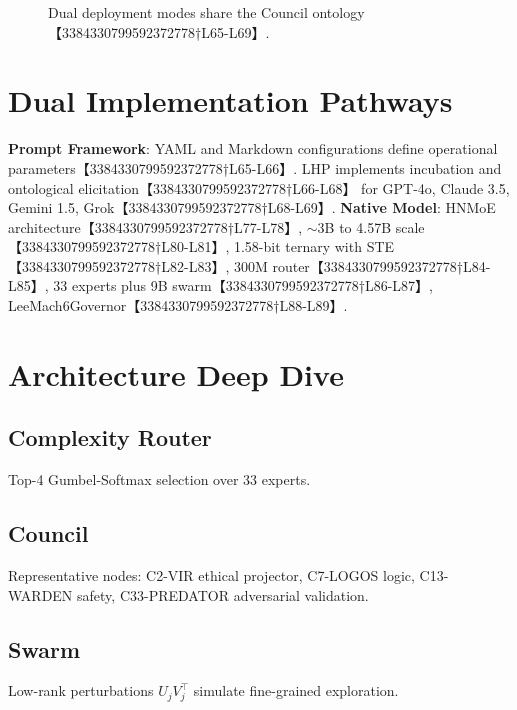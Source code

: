 \documentclass[11pt,a4paper,twocolumn]{article}
\begin{document}
\begin{figure}[htbp]
\centering
{}
\caption{Dual deployment modes share the Council ontology【3384330799592372778†L65-L69】.}
\label{fig:dual}
\end{figure}

\section{Dual Implementation Pathways}
\textbf{Prompt Framework}: YAML and Markdown configurations define operational parameters【3384330799592372778†L65-L66】. LHP implements incubation and ontological elicitation【3384330799592372778†L66-L68】 for GPT-4o, Claude 3.5, Gemini 1.5, Grok【3384330799592372778†L68-L69】. \textbf{Native Model}: HNMoE architecture【3384330799592372778†L77-L78】, $\sim$3B to 4.57B scale【3384330799592372778†L80-L81】, 1.58-bit ternary with STE【3384330799592372778†L82-L83】, 300M router【3384330799592372778†L84-L85】, 33 experts plus 9B swarm【3384330799592372778†L86-L87】, LeeMach6Governor【3384330799592372778†L88-L89】.

\section{Architecture Deep Dive}
\subsection{Complexity Router}
Top-4 Gumbel-Softmax selection over 33 experts.
\subsection{Council}
Representative nodes: C2-VIR ethical projector, C7-LOGOS logic, C13-WARDEN safety, C33-PREDATOR adversarial validation.
\subsection{Swarm}
Low-rank perturbations $U_jV_j^\top$ simulate fine-grained exploration.
\end{document}
